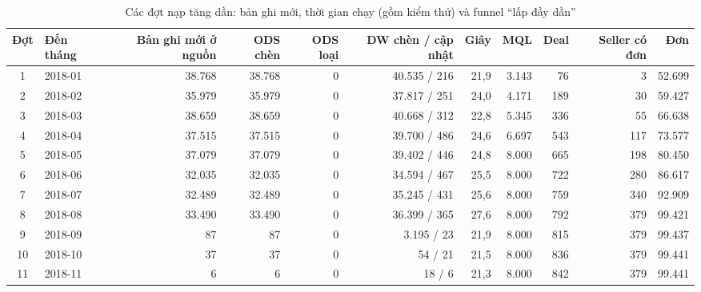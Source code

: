 \begin{table}[htbp]
\centering\small
\caption{Các đợt nạp tăng dần: bản ghi mới, thời gian chạy (gồm kiểm thử) và funnel “lấp đầy dần”}
\label{tab:increments}
\begin{tabular}{clrrrrrrrrr}
\toprule
\textbf{Đợt} & \textbf{Đến tháng} & \textbf{Bản ghi mới ở nguồn} & \textbf{ODS chèn} & \textbf{ODS loại} & \textbf{DW chèn / cập nhật} & \textbf{Giây} & \textbf{MQL} & \textbf{Deal} & \textbf{Seller có đơn} & \textbf{Đơn} \\
\midrule
1 & 2018-01 & 38.768 & 38.768 & 0 & 40.535 / 216 & 21,9 & 3.143 & 76 & 3 & 52.699 \\
2 & 2018-02 & 35.979 & 35.979 & 0 & 37.817 / 251 & 24,0 & 4.171 & 189 & 30 & 59.427 \\
3 & 2018-03 & 38.659 & 38.659 & 0 & 40.668 / 312 & 22,8 & 5.345 & 336 & 55 & 66.638 \\
4 & 2018-04 & 37.515 & 37.515 & 0 & 39.700 / 486 & 24,6 & 6.697 & 543 & 117 & 73.577 \\
5 & 2018-05 & 37.079 & 37.079 & 0 & 39.402 / 446 & 24,8 & 8.000 & 665 & 198 & 80.450 \\
6 & 2018-06 & 32.035 & 32.035 & 0 & 34.594 / 467 & 25,5 & 8.000 & 722 & 280 & 86.617 \\
7 & 2018-07 & 32.489 & 32.489 & 0 & 35.245 / 431 & 25,6 & 8.000 & 759 & 340 & 92.909 \\
8 & 2018-08 & 33.490 & 33.490 & 0 & 36.399 / 365 & 27,6 & 8.000 & 792 & 379 & 99.421 \\
9 & 2018-09 & 87 & 87 & 0 & 3.195 / 23 & 21,9 & 8.000 & 815 & 379 & 99.437 \\
10 & 2018-10 & 37 & 37 & 0 & 54 / 21 & 21,5 & 8.000 & 836 & 379 & 99.441 \\
11 & 2018-11 & 6 & 6 & 0 & 18 / 6 & 21,3 & 8.000 & 842 & 379 & 99.441 \\
\bottomrule
\end{tabular}
\end{table}

